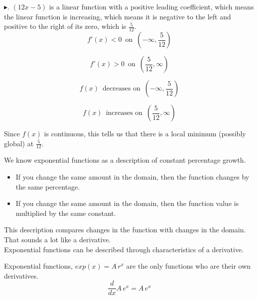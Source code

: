 \documentclass{ximera}
\begin{document}
\begin{example}
$\blacktriangleright$. $(12x - 5)$ is a linear function with a positive leading coefficient, which means the linear function is increasing, which means it is negative to the left and positive to the right of its zero, which is $\frac{5}{12}$. \\



\[
f'(x) < 0 \, \text{ on } \, \left( -\infty, \frac{5}{12} \right)
\]


\[
f'(x) > 0 \, \text{ on } \, \left( \frac{5}{12}, \infty \right)
\]





\[
f(x)  \, \text{ decreases on } \, \left( -\infty, \frac{5}{12} \right)
\]


\[
f(x)  \, \text{ increases on } \, \left( \frac{5}{12}, \infty \right)
\]



Since $f(x)$ is continuous, this tells us that there is a local minimum (possibly global) at $\frac{5}{12}$.


\end{example}






\begin{idea}


We know exponential functions as a description of constant percentage growth. 

\begin{itemize}
	\item If you change the same amount in the domain, then the function changes by the same percentage.
	\item If you change the same amount in the domain, then the function value is multiplied by the same constant.
\end{itemize}



This description compares changes in the function with changes in the domain. That sounds a lot like a derivative. \\

Exponential functions can be described through characteristics of a derivative.


\begin{center}

Exponential functions, $exp(x) = A \, r^x$ are the only functions who are their own derivatives. \\

\[
\frac{d}{dx} A \, e^x = A \, e^x
\]


\end{center}


\end{idea}
\end{document}
